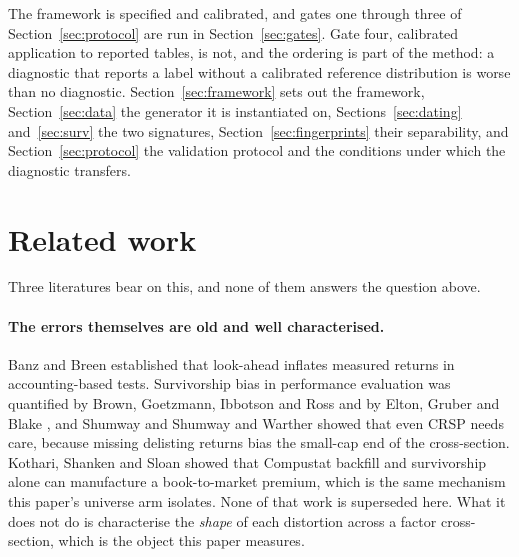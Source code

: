 \documentclass[11pt]{article}
\begin{document}
The framework is specified and calibrated, and gates one through three of
Section~\ref{sec:protocol} are run in Section~\ref{sec:gates}. Gate four, calibrated
application to reported tables, is not, and the ordering is part of the method: a
diagnostic that reports a label without a calibrated reference distribution is worse than
no diagnostic.
Section~\ref{sec:framework} sets out the framework, Section~\ref{sec:data} the generator
it is instantiated on, Sections~\ref{sec:dating} and~\ref{sec:surv} the two signatures,
Section~\ref{sec:fingerprints} their separability, and Section~\ref{sec:protocol} the
validation protocol and the conditions under which the diagnostic transfers.

\section{Related work}
\label{sec:related}

Three literatures bear on this, and none of them answers the question above.

\paragraph{The errors themselves are old and well characterised.} Banz and Breen
\cite{banz1986} established that look-ahead inflates measured returns in accounting-based
tests. Survivorship bias in performance evaluation was quantified by Brown, Goetzmann,
Ibbotson and Ross \cite{brown1992} and by Elton, Gruber and Blake \cite{elton1996}, and
Shumway \cite{shumway1997} and Shumway and Warther \cite{shumway1999} showed that even CRSP
needs care, because missing delisting returns bias the small-cap end of the cross-section.
Kothari, Shanken and Sloan \cite{kothari1995} showed that Compustat backfill and
survivorship alone can manufacture a book-to-market premium, which is the same
mechanism this paper's universe arm isolates. None of that work is superseded here. What it does not do is characterise the \emph{shape}
of each distortion across a factor cross-section, which is the object this paper measures.
\end{document}
